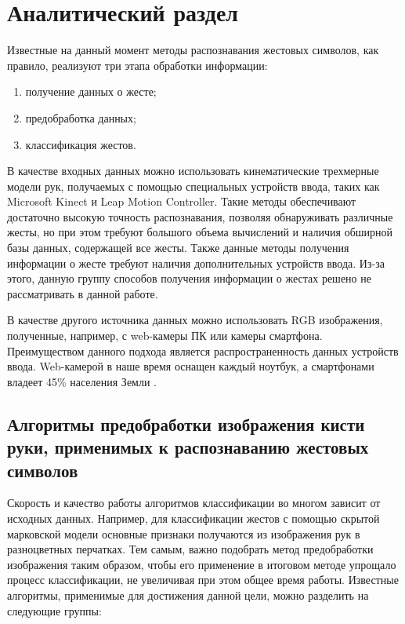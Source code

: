 \chapter{Аналитический раздел}
\label{cha:analysis}

Известные на данный момент методы распознавания жестовых символов, как правило, реализуют три этапа обработки информации:

\begin{enumerate}
	\item получение данных о жесте;
	\item предобработка данных;
	\item классификация жестов.
\end{enumerate}

В качестве входных данных можно использовать кинематические трехмерные модели рук, получаемых с помощью специальных устройств ввода, таких как Microsoft Kinect\cite{Wang} и Leap Motion Controller\cite{Mohandes}. Такие методы обеспечивают достаточно высокую точность распознавания, позволяя обнаруживать различные жесты, но при этом требуют большого объема вычислений и наличия обширной базы данных, содержащей все жесты. Также данные методы получения информации о жесте требуют наличия дополнительных устройств ввода. Из-за этого, данную группу способов получения информации о жестах решено не рассматривать в данной работе.

В качестве другого источника данных можно использовать RGB изображения, полученные, например, с web-камеры ПК или камеры смартфона. Преимуществом данного подхода является распространенность данных устройств ввода. Web-камерой в наше время оснащен каждый ноутбук, а смартфонами владеет 45\% населения Земли \cite{smartfones}.

\section{Алгоритмы предобработки изображения кисти руки, применимых к распознаванию жестовых символов}

Скорость и качество работы алгоритмов классификации во многом зависит от исходных данных. Например, для классификации жестов с помощью скрытой марковской модели\cite{Zhang} основные признаки получаются из изображения рук в разноцветных перчатках. Тем самым, важно подобрать метод предобработки изображения таким образом, чтобы его применение в итоговом методе упрощало процесс классификации, не увеличивая при этом общее время работы. Известные алгоритмы, применимые для достижения данной цели, можно разделить на следующие группы:

